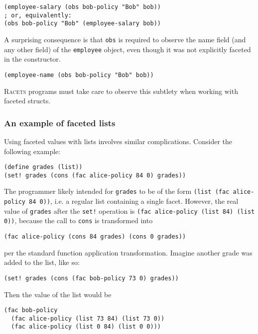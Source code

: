 \documentclass{article}
\begin{document}
\begin{lstlisting}
(employee-salary (obs bob-policy "Bob" bob))
; or, equivalently:
(obs bob-policy "Bob" (employee-salary bob))
\end{lstlisting}

A surprising consequence is that \texttt{obs} is required to observe the name field (and any other field) of the \texttt{employee} object, even though it was not explicitly faceted in the constructor.

\begin{lstlisting}
(employee-name (obs bob-policy "Bob" bob))
\end{lstlisting}

\textsc{Racets} programs must take care to observe this subtlety when working with faceted structs.


\subsubsection{An example of faceted lists}
Using faceted values with lists involves similar complications. Consider the following example:

\begin{lstlisting}
(define grades (list))
(set! grades (cons (fac alice-policy 84 0) grades))
\end{lstlisting}

The programmer likely intended for \texttt{grades} to be of the form \texttt{(list (fac alice-policy 84 0))}, i.e. a regular list containing a single facet. However, the real value of \texttt{grades} after the \texttt{set!} operation is \texttt{(fac alice-policy (list 84) (list 0))}, because the call to \texttt{cons} is transformed into

\begin{lstlisting}
(fac alice-policy (cons 84 grades) (cons 0 grades))
\end{lstlisting}

\noindent per the standard function application transformation. Imagine another grade was added to the list, like so:

\begin{lstlisting}
(set! grades (cons (fac bob-policy 73 0) grades))
\end{lstlisting}

Then the value of the list would be

\begin{lstlisting}
(fac bob-policy
  (fac alice-policy (list 73 84) (list 73 0))
  (fac alice-policy (list 0 84) (list 0 0)))
\end{lstlisting}
\end{document}
